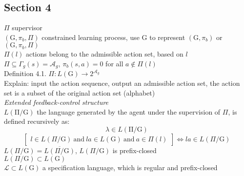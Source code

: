 \documentclass{article}
\begin{document}
\subsection{Section 4}
$\Pi$ \quad supervisor\\
$(\mathrm{G},\pi_b,\Pi)$ \quad constrained learning process, use $\mathrm{G}$ to represent $(\mathrm{G},\pi_b)$ or $(\mathrm{G},\pi_b,\Pi)$\\
$\Pi(l)$ \quad actions belong to the admissible action set, based on $l$\\
$\Pi \subseteq \Gamma_g(s)=\mathcal{A}_g$, $\pi_b(s,a)=0$ for all $a \notin \Pi(l)$\\
Definition 4.1. $\Pi: L(\mathrm{G}) \rightarrow2^{\mathcal{A}_g}$\\
Explain: input the action sequence, output an admissible action set, the action set is a subset of the original action set (alphabet)\\
\textit{Extended feedback-control structure}\\
$L(\mathrm{\Pi/\mathrm{G}})$ \quad the language generated by the agent under the supervision of $\Pi$, is defined recursively as:
$$\lambda \in L(\mathrm{\Pi/\mathrm{G}})$$
$$\left.\left[\begin{array}{c}l\in L(\Pi/\mathrm{G})\ \mathrm{and} \ l a \in L(\mathrm{G})\ \mathrm{and}\ a\in\Pi(l)\end{array}\right.\right]\Leftrightarrow la \in L(\Pi/\mathrm{G})$$
$L(\Pi/\mathrm{G})=\overline{L(\Pi/\mathrm{G})}$, $L(\Pi/\mathrm{G})$ is prefix-closed\\
$L(\Pi/\mathrm{G}) \subset L(\mathrm{G})$\\
$\mathcal{L}\subset L(\mathrm{G})$ a specification language, which is regular and prefix-closed\\
\end{document}
